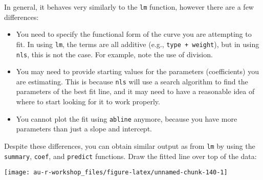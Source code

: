 \documentclass[]{book}
\newenvironment{Shaded}{\begin{snugshade}}{\end{snugshade}}
\newcommand{\KeywordTok}[1]{\textcolor[rgb]{0.13,0.29,0.53}{\textbf{#1}}}
\newcommand{\DataTypeTok}[1]{\textcolor[rgb]{0.13,0.29,0.53}{#1}}
\newcommand{\DecValTok}[1]{\textcolor[rgb]{0.00,0.00,0.81}{#1}}
\newcommand{\FloatTok}[1]{\textcolor[rgb]{0.00,0.00,0.81}{#1}}
\newcommand{\StringTok}[1]{\textcolor[rgb]{0.31,0.60,0.02}{#1}}
\newcommand{\OperatorTok}[1]{\textcolor[rgb]{0.81,0.36,0.00}{\textbf{#1}}}
\newcommand{\NormalTok}[1]{#1}
\theoremstyle{definition}
\theoremstyle{definition}
\theoremstyle{definition}
\theoremstyle{remark}
\begin{document}
In general, it behaves very similarly to the \texttt{lm} function,
however there are a few differences:

\begin{itemize}
\item
  You need to specify the functional form of the curve you are
  attempting to fit. In using \texttt{lm}, the terms are all additive
  (e.g., \texttt{type\ +\ weight}), but in using \texttt{nls}, this is
  not the case. For example, note the use of division.
\item
  You may need to provide starting values for the parameters
  (coefficients) you are estimating. This is because \texttt{nls} will
  use a search algorithm to find the parameters of the best fit line,
  and it may need to have a reasonable idea of where to start looking
  for it to work properly.
\item
  You cannot plot the fit using \texttt{abline} anymore, because you
  have more parameters than just a slope and intercept.
\end{itemize}

Despite these differences, you can obtain similar output as from
\texttt{lm} by using the \texttt{summary}, \texttt{coef}, and
\texttt{predict} functions. Draw the fitted line over top of the data:

\begin{Shaded}
\end{Shaded}

\begin{center}\texttt{[image: au-r-workshop\_files/figure-latex/unnamed-chunk-140-1]} \end{center}
\end{document}
